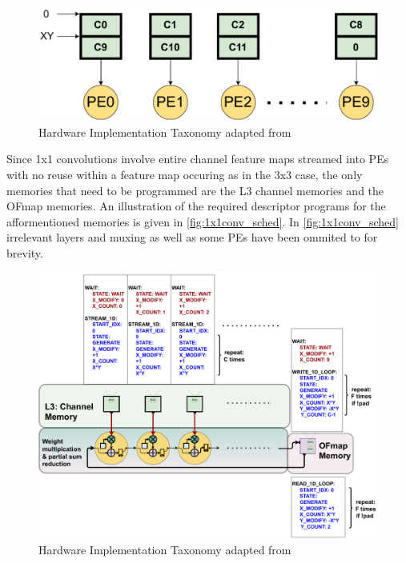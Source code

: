 \begin{figure}[ht]
    \centering
    \includegraphics[scale=0.495]{fig/1x1conv_ifmap_banking.pdf}
    \caption{Hardware Implementation Taxonomy adapted from \cite{maestro}}
    \label{fig:channel_banking}
\end{figure}

Since 1x1 convolutions involve entire channel feature maps streamed into PEs
with no reuse within a feature map occuring as in the 3x3 case, the only
memories that need to be programmed are the L3 channel memories and the OFmap
memories. An illustration of the required descriptor programs for the
afformentioned memories is given in \autoref{fig:1x1conv_sched}. In
\autoref{fig:1x1conv_sched} irrelevant layers and muxing as well as some PEs
have been ommited to for brevity.

\begin{figure}[ht]
    \centering
    \includegraphics[scale=0.495]{fig/1x1conv_sched.pdf}
    \caption{Hardware Implementation Taxonomy adapted from \cite{maestro}}
    \label{fig:1x1conv_sched}
\end{figure}

